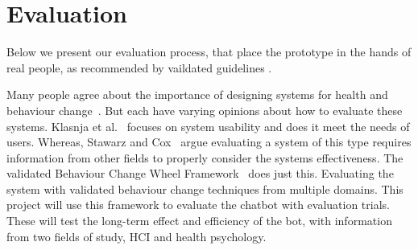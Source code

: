 
\newpage
\section{Evaluation}
Below we present our evaluation process, that place the prototype in the hands of real people, as recommended by vaildated guidelines \cite{article_mhealth, article_evaluate_tech_health_behaviour_change}.

Many people agree about the importance of designing systems for health and behaviour
change~\cite{article_mhealth, article_designing_for_healthy_lifestyles, article_designing_for_health_behaviour_change_hci}.
But each have varying opinions about how to evaluate these systems. Klasnja et al.~\cite{article_evaluate_tech_health_behaviour_change} focuses on system usability and does it meet the needs of users.
Whereas, Stawarz and Cox~\cite{article_designing_for_health_behaviour_change_hci} argue evaluating a system of this type requires information from other fields
to properly consider the systems effectiveness. The validated Behaviour Change Wheel Framework~\cite{article_behaviour_change_wheel} does just this.
Evaluating the system with validated behaviour change techniques from multiple domains. This project will use this framework to evaluate the chatbot with evaluation trials.
These will test the long-term effect and efficiency of the bot, with information from two fields of study, HCI and health psychology.

